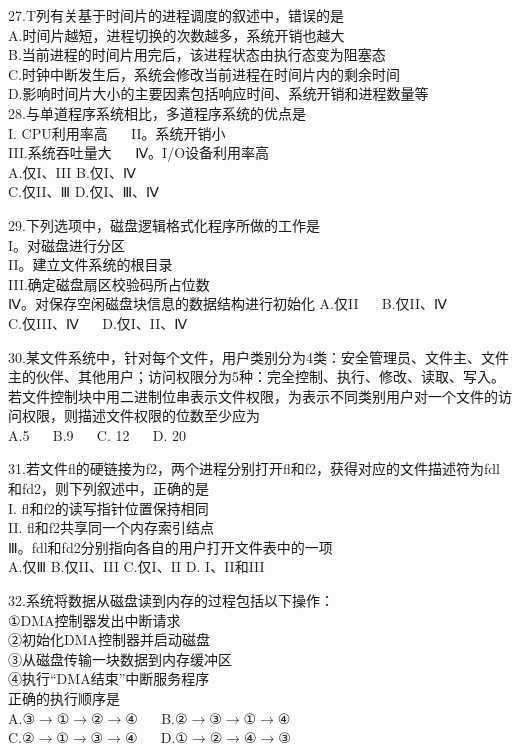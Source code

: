 27.T列有关基于时间片的进程调度的叙述中，错误的是 \\
A.时间片越短，进程切换的次数越多，系统开销也越大 \\
B.当前进程的时间片用完后，该进程状态由执行态变为阻塞态 \\
C.时钟中断发生后，系统会修改当前进程在时间片内的剩余时间 \\
D.影响时间片大小的主要因素包括响应时间、系统开销和进程数量等 \\

28.与单道程序系统相比，多道程序系统的优点是 \\
I. CPU利用率高  $\quad$  II。系统开销小 \\
III.系统吞吐量大  $\quad$  Ⅳ。I/O设备利用率高 \\
A.仅I、III    B.仅I、Ⅳ \\
C.仅II、Ⅲ    D.仅I、Ⅲ、Ⅳ

29.下列选项中，磁盘逻辑格式化程序所做的工作是 \\
I。对磁盘进行分区 \\
II。建立文件系统的根目录 \\
III.确定磁盘扇区校验码所占位数 \\
Ⅳ。对保存空闲磁盘块信息的数据结构进行初始化
A.仅II  $\quad$  B.仅II、Ⅳ \\
C.仅III、Ⅳ  $\quad$  D.仅I、II、Ⅳ

30.某文件系统中，针对每个文件，用户类别分为4类：安全管理员、文件主、文件主的伙伴、其他用户；访问权限分为5种：完全控制、执行、修改、读取、写入。若文件控制块中用二进制位串表示文件权限，为表示不同类别用户对一个文件的访问权限，则描述文件权限的位数至少应为 \\
A.5  $\quad$  B.9  $\quad$  C. 12  $\quad$  D. 20

31.若文件fl的硬链接为f2，两个进程分别打开fl和f2，获得对应的文件描述符为fdl和fd2，则下列叙述中，正确的是 \\
I. fl和f2的读写指针位置保持相同 \\
II. fl和f2共享同一个内存索引结点 \\
Ⅲ。fdl和fd2分别指向各自的用户打开文件表中的一项 \\
A.仅Ⅲ    B.仅II、III    C.仅I、II    D.  I、II和III

32.系统将数据从磁盘读到内存的过程包括以下操作： \\
①DMA控制器发出中断请求 \\
②初始化DMA控制器并启动磁盘 \\
③从磁盘传输一块数据到内存缓冲区 \\
④执行“DMA结束”中断服务程序 \\
正确的执行顺序是 \\
A.③$\rightarrow$①$\rightarrow$②$\rightarrow$④  $\quad$  B.②$\rightarrow$③$\rightarrow$①$\rightarrow$④ \\
C.②$\rightarrow$①$\rightarrow$③$\rightarrow$④  $\quad$  D.①$\rightarrow$②$\rightarrow$④$\rightarrow$③

